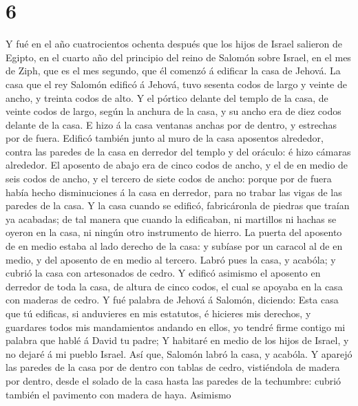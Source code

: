 \hypertarget{section-5}{%
\section{6}\label{section-5}}

 Y fué en el año cuatrocientos ochenta después que los
hijos de Israel salieron de Egipto, en el cuarto año del principio del
reino de Salomón sobre Israel, en el mes de Ziph, que es el mes segundo,
que él comenzó á edificar la casa de Jehová.  La casa que
el rey Salomón edificó á Jehová, tuvo sesenta codos de largo y veinte de
ancho, y treinta codos de alto.  Y el pórtico delante del
templo de la casa, de veinte codos de largo, según la anchura de la
casa, y su ancho era de diez codos delante de la casa.  E
hizo á la casa ventanas anchas por de dentro, y estrechas por de fuera.
 Edificó también junto al muro de la casa aposentos
alrededor, contra las paredes de la casa en derredor del templo y del
oráculo: é hizo cámaras alrededor.  El aposento de abajo
era de cinco codos de ancho, y el de en medio de seis codos de ancho, y
el tercero de siete codos de ancho: porque por de fuera había hecho
disminuciones á la casa en derredor, para no trabar las vigas de las
paredes de la casa.  Y la casa cuando se edificó,
fabricáronla de piedras que traían ya acabadas; de tal manera que cuando
la edificaban, ni martillos ni hachas se oyeron en la casa, ni ningún
otro instrumento de hierro.  La puerta del aposento de en
medio estaba al lado derecho de la casa: y subíase por un caracol al de
en medio, y del aposento de en medio al tercero.  Labró
pues la casa, y acabóla; y cubrió la casa con artesonados de cedro.
 Y edificó asimismo el aposento en derredor de toda la
casa, de altura de cinco codos, el cual se apoyaba en la casa con
maderas de cedro.  Y fué palabra de Jehová á Salomón,
diciendo:  Esta casa que tú edificas, si anduvieres en
mis estatutos, é hicieres mis derechos, y guardares todos mis
mandamientos andando en ellos, yo tendré firme contigo mi palabra que
hablé á David tu padre;  Y habitaré en medio de los hijos
de Israel, y no dejaré á mi pueblo Israel.  Así que,
Salomón labró la casa, y acabóla.  Y aparejó las paredes
de la casa por de dentro con tablas de cedro, vistiéndola de madera por
dentro, desde el solado de la casa hasta las paredes de la techumbre:
cubrió también el pavimento con madera de haya.  Asimismo
